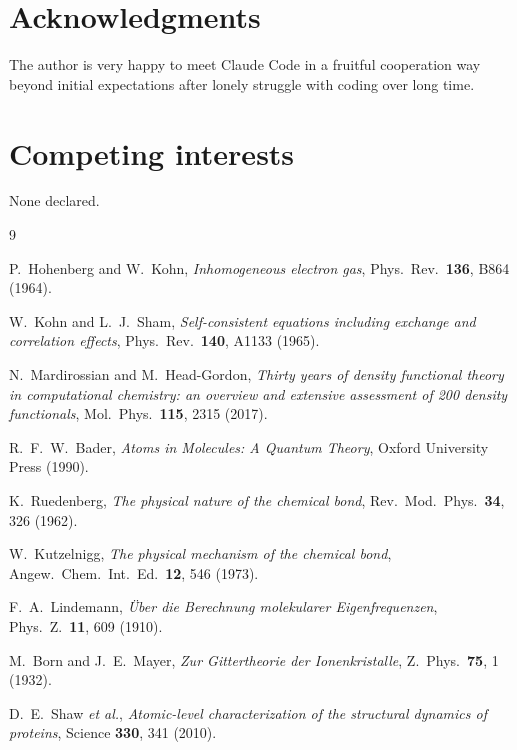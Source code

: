 \documentclass[11pt]{article}
\begin{document}
\section*{Acknowledgments}

The author is very happy to meet Claude Code in a fruitful cooperation way beyond initial expectations after lonely struggle with coding over long time.

\section*{Competing interests}

None declared.

\begin{thebibliography}{9}

P.~Hohenberg and W.~Kohn,
\emph{Inhomogeneous electron gas},
Phys.\ Rev.\ \textbf{136}, B864 (1964).

W.~Kohn and L.~J.~Sham,
\emph{Self-consistent equations including exchange and correlation effects},
Phys.\ Rev.\ \textbf{140}, A1133 (1965).

N.~Mardirossian and M.~Head-Gordon,
\emph{Thirty years of density functional theory in computational chemistry: an overview and extensive assessment of 200 density functionals},
Mol.\ Phys.\ \textbf{115}, 2315 (2017).

R.~F.~W.~Bader,
\emph{Atoms in Molecules: A Quantum Theory},
Oxford University Press (1990).

K.~Ruedenberg,
\emph{The physical nature of the chemical bond},
Rev.\ Mod.\ Phys.\ \textbf{34}, 326 (1962).

W.~Kutzelnigg,
\emph{The physical mechanism of the chemical bond},
Angew.\ Chem.\ Int.\ Ed.\ \textbf{12}, 546 (1973).

F.~A.~Lindemann,
\emph{\"Uber die Berechnung molekularer Eigenfrequenzen},
Phys.\ Z.\ \textbf{11}, 609 (1910).

M.~Born and J.~E.~Mayer,
\emph{Zur Gittertheorie der Ionenkristalle},
Z.~Phys.\ \textbf{75}, 1 (1932).

D.~E.~Shaw \emph{et al.},
\emph{Atomic-level characterization of the structural dynamics of proteins},
Science \textbf{330}, 341 (2010).

\end{thebibliography}
\end{document}
